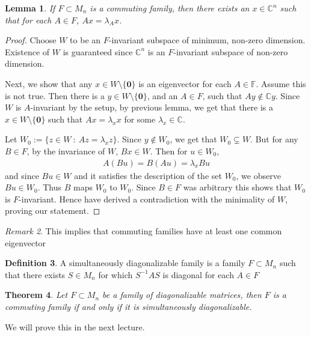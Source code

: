 \documentclass[12pt]{article}
\newtheorem{thm}{Theorem}[section]
\newtheorem{lemma}[thm]{Lemma}
\theoremstyle{definition}
\newtheorem{defn}[thm]{Definition}
\theoremstyle{remark}
\newtheorem{rem}[thm]{Remark}
\begin{document}
\begin{lemma}
  If $F \subset M_n$ is a commuting family, then there exists an $x
  \in \mathbb{C}^n$ such that for each $A \in F$, $Ax = \lambda_A x$.
\end{lemma}
\begin{proof}
  Choose $W$ to be an $F$-invariant subspace of minimum, non-zero
  dimension. Existence of $W$ is guaranteed since $\mathbb{C}^n$ is
  an $F$-invariant subspace of non-zero dimension.

  Next, we show that any $ x \in W \setminus \{ \textbf{0} \}$ is an
  eigenvector for each $ A \in \mathbb{F}$. Assume this is not true.
  Then there is  a $ y\in W \setminus \{ \textbf{0} \}$, and an $ A
  \in F$, such that $Ay \not\in \mathbb{C}y$. Since $W$ is
  $A$-invariant by the setup, by previous lemma, we get that there is
  a $x \in W \setminus \{ \textbf{0} \}$ such that $Ax = \lambda_x x$
  for some $\lambda_x \in \mathbb{C}$.

  Let $ W_0 := \{ z \in W \ : \ Az = \lambda_x z \}$. Since $y \notin
  W_0$, we get that $W_0 \subsetneq W$. But for any $B \in F$, by the
  invariance of $W$, $Bx \in W$. Then for $u \in W_0$,
  \begin{align*}
    A(Bu) = B(Au) =  \lambda_x Bu
  \end{align*}
  and since $Bu \in W$ and it satisfies the description of the set
  $W_0$, we observe $Bu \in W_0$. Thus $B$ maps $W_0$ to $W_0$. Since
  $ B \in F$ was arbitrary this shows that $W_0$ is $F$-invariant.
  Hence have derived a contradiction with the
  minimality of $W$, proving our statement.
\end{proof}

\begin{rem}
  This implies that commuting families have at least one common eigenvector
\end{rem}

\begin{defn}
  A simultaneously diagonalizable family is a family $F \subset M_n$
  such that there exists $S \in M_n$ for which $S^{-1} A S$ is
  diagonal for each $A \in F$
\end{defn}

\begin{thm}
  Let $F \subset M_n$ be a family of diagonalizable matrices, then
  $F$ is a commuting family if and only if it is simultaneously diagonalizable.
\end{thm}
We will prove this in the next lecture.
\end{document}
